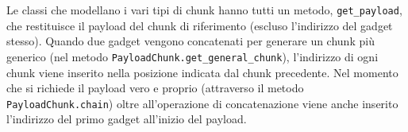 Le classi che modellano i vari tipi di chunk hanno tutti un metodo,
\lstinline{get_payload}, che restituisce il payload del chunk di
riferimento (escluso l'indirizzo del gadget stesso). Quando due gadget
vengono concatenati per generare un chunk più generico (nel metodo
\lstinline{PayloadChunk.get_general_chunk}), l'indirizzo di ogni chunk
viene inserito nella posizione indicata dal chunk precedente. Nel
momento che si richiede il payload vero e proprio (attraverso il
metodo \lstinline{PayloadChunk.chain}) oltre all'operazione di
concatenazione viene anche inserito l'indirizzo del primo gadget
all'inizio del payload.










